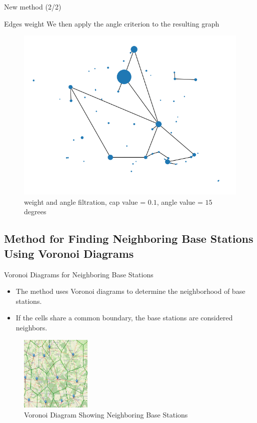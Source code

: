 \begin{frame}{New method (2/2)}
    \begin{block}{Edges weight}
        We then apply the angle criterion to the resulting graph
    \end{block}

    \begin{figure}
        \includegraphics[height=0.4\paperheight]{images/road_detection/edges_weight_angle_filtration.png}
        \caption{weight and angle filtration, cap value = $0.1$, angle value = $15$ degrees}
    \end{figure}
\end{frame} 

\subsection{Method for Finding Neighboring Base Stations Using Voronoi Diagrams}
\insertsubsectionframe

\begin{frame}{Voronoi Diagrams for Neighboring Base Stations}
    \begin{itemize}
        \item The method uses Voronoi diagrams to determine the neighborhood of base stations.
        \item If the cells share a common boundary, the base stations are considered neighbors.
    \end{itemize}
    \begin{figure}
        \centering
        \includegraphics[width=0.3\textwidth]{images/Altair/voron-neighb.png} 
        \caption{Voronoi Diagram Showing Neighboring Base Stations}
    \end{figure}
\end{frame}

